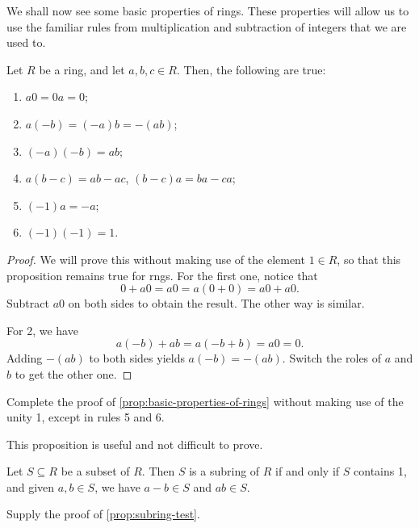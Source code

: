 \documentclass[./main.tex]{subfiles}
\begin{document}
We shall now see some basic properties of rings. These properties will allow us
to use the familiar rules from multiplication and subtraction of integers that
we are used to.
\begin{proposition}
\label{prop:basic-properties-of-rings}
    Let $R$ be a ring, and let $a, b, c \in R$.
    Then, the following are true:
    \begin{enumerate}
        \item $a0 = 0a = 0$;
        \item $a(-b) = (-a)b = -(ab)$;
        \item $(-a)(-b) = ab$;
        \item $a(b-c) = ab -ac$, $(b-c)a = ba-ca$;
        \item $(-1)a = -a$;
        \item $(-1)(-1) = 1$.
    \end{enumerate}
\end{proposition}
\begin{proof}
    We will prove this without making use of the element $1 \in R$, so that this
    proposition remains true for rngs. For the first one, notice that 
    \[
        0 + a0 = a0 = a(0+0) = a0 + a0.
    \]
    Subtract $a0$ on both sides to obtain the result. The other way is similar.

    For 2, we have 
    \[
        a(-b) + ab = a(-b + b) = a0 = 0.
    \]
    Adding $-(ab)$ to both sides yields $a(-b) = -(ab)$. Switch the roles of $a$
    and $b$ to get the other one.
\end{proof}

\begin{exercise}
    Complete the proof of \cref{prop:basic-properties-of-rings} without making
    use of the unity 1, except in rules 5 and 6.
\end{exercise}

This proposition is useful and not difficult to prove.
\begin{proposition}
\label{prop:subring-test}
    Let $S \subseteq R$ be a subset of $R$. Then $S$ is a subring of $R$ if and
    only if $S$ contains 1, and given $a, b \in S$, we have $a-b \in S$ and $ab
    \in S$.
\end{proposition}
\begin{exercise}
    Supply the proof of \cref{prop:subring-test}.
\end{exercise}
\end{document}

